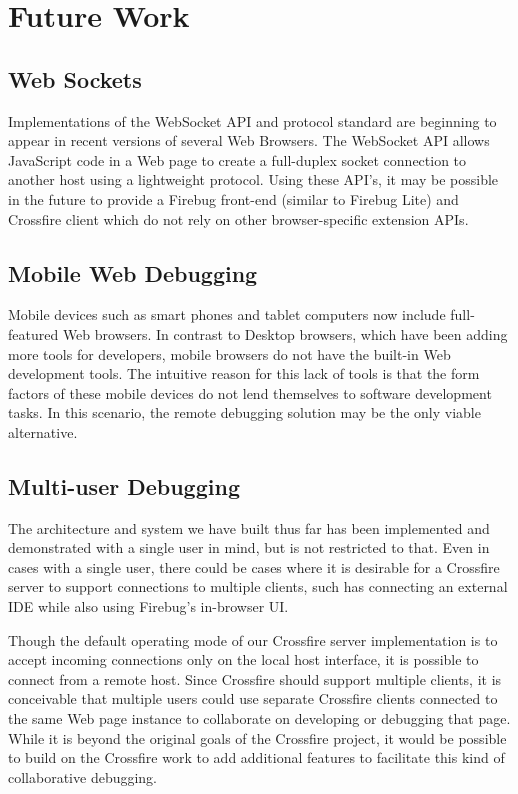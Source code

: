 \section {Future Work}
\subsection {Web Sockets}
Implementations of the WebSocket API\cite{websocketapi} and
protocol\cite{websocketprotocol} standard are beginning to appear in recent
versions of several Web Browsers. The WebSocket API allows JavaScript code in a
Web page to create a full-duplex socket connection to another host using a
lightweight protocol. Using these API's, it may be possible in the future to
provide a Firebug front-end (similar to Firebug Lite) and Crossfire client which
do not rely on other browser-specific extension APIs.
\subsection {Mobile Web Debugging}
Mobile devices such as smart phones and tablet computers now include
full-featured Web browsers. In contrast to Desktop browsers, which have
been adding more tools for developers, mobile browsers do not have the built-in
Web development tools. The intuitive reason for this lack of tools is that the
form factors of these mobile devices do not lend themselves to software
development tasks. In this scenario, the remote debugging solution may be the
only viable alternative.

\subsection {Multi-user Debugging}
The architecture and system we have built thus far has been implemented and
demonstrated with a single user in mind, but is not restricted to that. Even in
cases with a single user, there could be cases where it is desirable for a
Crossfire server to support connections to multiple clients, such has connecting
an external IDE while also using Firebug's in-browser UI.

Though the default operating mode of our Crossfire server implementation is to
accept incoming connections only on the local host interface, it is possible to
connect from a remote host. Since Crossfire should support multiple clients, it
is conceivable that multiple users could use separate Crossfire clients
connected to the same Web page instance to collaborate on developing or
debugging that page. While it is beyond the original goals of the Crossfire
project, it would be possible to build on the Crossfire work to add additional
features to facilitate this kind of collaborative debugging.
